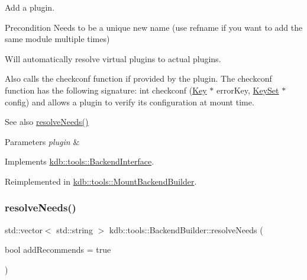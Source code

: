 Add a plugin. 

\begin{DoxyPrecond}{Precondition}
Needs to be a unique new name (use refname if you want to add the same module multiple times)
\end{DoxyPrecond}
Will automatically resolve virtual plugins to actual plugins.

Also calls the checkconf function if provided by the plugin. The checkconf function has the following signature\+: int checkconf (\mbox{\hyperlink{classkdb_1_1Key}{Key}} $\ast$ error\+Key, \mbox{\hyperlink{classkdb_1_1KeySet}{Key\+Set}} $\ast$ config) and allows a plugin to verify its configuration at mount time.

\begin{DoxySeeAlso}{See also}
\mbox{\hyperlink{classkdb_1_1tools_1_1BackendBuilder_a6e6c23716dc72ef68f8acfd71fc802a9}{resolve\+Needs()}} 
\end{DoxySeeAlso}

\begin{DoxyParams}{Parameters}
{\em plugin} & \\
\hline
\end{DoxyParams}


Implements \mbox{\hyperlink{classkdb_1_1tools_1_1BackendInterface}{kdb\+::tools\+::\+Backend\+Interface}}.



Reimplemented in \mbox{\hyperlink{classkdb_1_1tools_1_1MountBackendBuilder_a2603e75436a49fc66696c1b41b27efb9}{kdb\+::tools\+::\+Mount\+Backend\+Builder}}.

\mbox{\label{classkdb_1_1tools_1_1BackendBuilder_a6e6c23716dc72ef68f8acfd71fc802a9}} 
\subsubsection{\texorpdfstring{resolveNeeds()}{resolveNeeds()}}
{\footnotesize\ttfamily std\+::vector$<$ std\+::string $>$ kdb\+::tools\+::\+Backend\+Builder\+::resolve\+Needs (\begin{DoxyParamCaption}\item[{bool}]{add\+Recommends = {\ttfamily true} }\end{DoxyParamCaption})}



